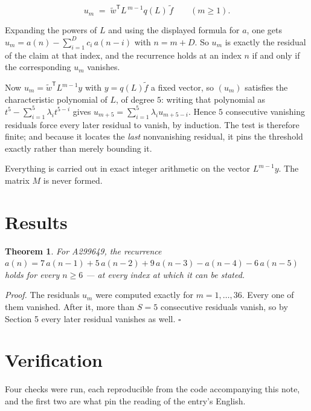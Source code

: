 \documentclass[11pt]{article}
\newtheorem{theorem}{Theorem}
\theoremstyle{definition}
\begin{document}
\[u_m \;=\; \tilde w^{\mathsf T} L^{\,m-1} q(L)\,\tilde f \qquad (m \ge 1).\]

Expanding the powers of $L$ and using the displayed formula for $a$, one gets $u_m = a(n) - \sum_{i=1}^{D} c_i\,a(n-i)$ with $n = m + D$. So $u_m$ is exactly the residual of the claim at that index, and the recurrence holds at an index $n$ if and only if the corresponding $u_m$ vanishes.

Now $u_m = \tilde w^{\mathsf T} L^{m-1} y$ with $y = q(L)\tilde f$ a fixed vector, so $(u_m)$ satisfies the characteristic polynomial of $L$, of degree $5$: writing that polynomial as $t^{5} - \sum_{i=1}^{5} \lambda_i t^{5-i}$ gives $u_{m+5} = \sum_{i=1}^{5} \lambda_i u_{m+5-i}$. Hence $5$ consecutive vanishing residuals force every later residual to vanish, by induction. The test is therefore finite; and because it locates the {\itshape last} nonvanishing residual, it pins the threshold exactly rather than merely bounding it.

Everything is carried out in exact integer arithmetic on the vector $L^{m-1}y$. The matrix $M$ is never formed.

\section{Results}

\begin{theorem} For A299649, the recurrence $a(n) = 7\,a(n-1) + 5\,a(n-2) + 9\,a(n-3) - a(n-4) - 6\,a(n-5)$ holds for every $n \ge 6$ --- at every index at which it can be stated.\end{theorem}

{\itshape Proof.} The residuals $u_m$ were computed exactly for $m = 1,\dots,36$. Every one of them vanished. After it, more than $S = 5$ consecutive residuals vanish, so by Section 5 every later residual vanishes as well. $\square$

\section{Verification}

Four checks were run, each reproducible from the code accompanying this note, and the first two are what pin the reading of the entry's English.
\end{document}
